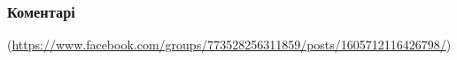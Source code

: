  
 
 
 
 
\subsubsection{Коментарі}

\begin{itemize}
 

(\url{https://www.facebook.com/groups/773528256311859/posts/1605712116426798/})


\end{itemize}
